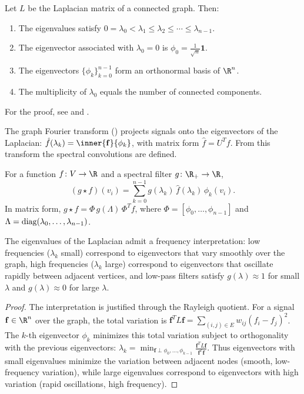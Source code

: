 \begin{theorem}
\label{thm:grids:spectral-laplacian}
Let $L$ be the Laplacian matrix of a connected graph. Then:
\begin{enumerate}
  \item The eigenvalues satisfy $0 = \lambda_0 < \lambda_1 \leq \lambda_2 \leq
    \cdots \leq \lambda_{n-1}$.
  \item The eigenvector associated with $\lambda_0 = 0$ is
    $\phi_0 = \frac{1}{\sqrt{n}} \mathbf{1}$.
  \item The eigenvectors $\{\phi_k\}_{k=0}^{n-1}$ form an orthonormal basis of
    $\R^n$.
  \item The multiplicity of $\lambda_0$ equals the number of connected
    components.
\end{enumerate}
For the proof, see \citep[Chapters~1--2]{Chung1997} and .
\end{theorem}

The graph Fourier transform () projects signals onto the
eigenvectors of the Laplacian: $\hat{f}(\lambda_k) = \inner{\mathbf{f}}{\phi_k}$,
with matrix form $\hat{f} = U^T f$. From this transform the spectral
convolutions are defined.

\begin{definition}
\label{def:grids:spectral-conv-graphs}
For a function $f \colon V \to \R$ and a spectral filter
$g \colon \R_+ \to \R$,
\[
  (g \star f)(v_i) = \sum_{k=0}^{n-1} g(\lambda_k)\, \hat{f}(\lambda_k)\, \phi_k(v_i).
\]
In matrix form, $g \star f = \Phi\, g(\Lambda)\, \Phi^T f$, where
$\Phi = [\phi_0, \ldots, \phi_{n-1}]$ and
$\Lambda = \operatorname{diag}(\lambda_0, \ldots, \lambda_{n-1})$.
\end{definition}

\begin{theorem}
\label{thm:grids:freq-interp-graphs}
The eigenvalues of the Laplacian admit a frequency interpretation: low
frequencies ($\lambda_k$ small) correspond to eigenvectors that vary smoothly
over the graph, high frequencies ($\lambda_k$ large) correspond to eigenvectors
that oscillate rapidly between adjacent vertices, and low-pass filters satisfy
$g(\lambda) \approx 1$ for small $\lambda$ and $g(\lambda) \approx 0$ for large
$\lambda$.
\end{theorem}

\begin{proof}
The interpretation is justified through the Rayleigh quotient. For a signal
$\mathbf{f} \in \R^n$ over the graph, the total variation is
$\mathbf{f}^T L \mathbf{f} = \sum_{(i,j) \in E} w_{ij}(f_i - f_j)^2$. The
$k$-th eigenvector $\phi_k$ minimizes this total variation subject to
orthogonality with the previous eigenvectors:
$\lambda_k = \min_{\mathbf{f} \perp \phi_0, \ldots, \phi_{k-1}}
\frac{\mathbf{f}^T L \mathbf{f}}{\mathbf{f}^T \mathbf{f}}$. Thus eigenvectors
with small eigenvalues minimize the variation between adjacent nodes (smooth,
low-frequency variation), while large eigenvalues correspond to eigenvectors
with high variation (rapid oscillations, high frequency).
\end{proof}

